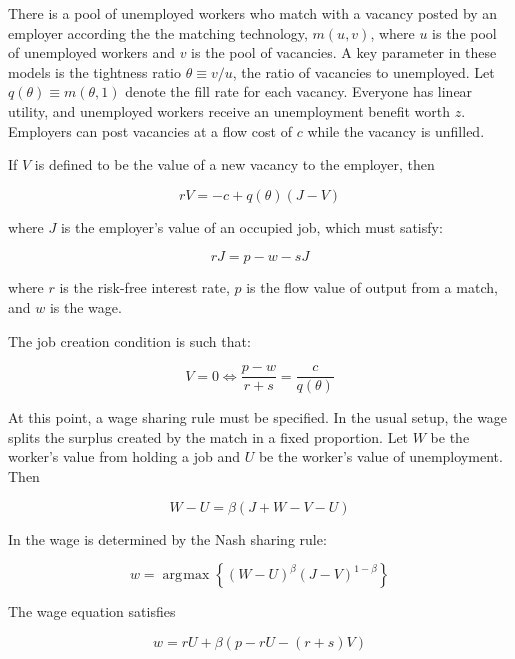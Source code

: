 \documentclass[11pt]{article}
\DeclareMathOperator*{\argmax}{arg\!\max}
\begin{document}
There is a pool of unemployed workers who match with a vacancy posted by an employer according the the matching technology, $m(u, v)$,
where $u$ is the pool of unemployed workers and $v$ is the pool of vacancies.
A key parameter in these models is the tightness ratio $\theta \equiv v/u$, the ratio of vacancies to unemployed.
Let $q(\theta) \equiv m(\theta, 1)$ denote the fill rate for each vacancy.
Everyone has linear utility, and unemployed workers receive an unemployment benefit worth $z$.
Employers can post vacancies at a flow cost of $c$ while the vacancy is unfilled.

If $V$ is defined to be the value of a new vacancy to the employer, then

\begin{equation}
    rV = -c + q(\theta)(J - V)
\end{equation}

where $J$ is the employer's value of an occupied job, which must satisfy:

\begin{equation}
    rJ = p - w - sJ
\end{equation}

where $r$ is the risk-free interest rate, $p$ is the flow value of output from a match, and $w$ is the wage.

The job creation condition is such that:

\begin{equation}
    V = 0 \iff \frac{p - w}{r + s} = \frac{c}{q(\theta)}
\end{equation}

At this point, a wage sharing rule must be specified.
In the usual setup, the wage splits the surplus created by the match in a fixed proportion.
Let $W$ be the worker's value from holding a job and $U$ be the worker's value of unemployment.
Then

\begin{equation}
    W - U = \beta (J + W - V - U)
\end{equation}

In \cite{pissarides_2009} the wage is determined by the Nash sharing rule:

\begin{equation}
    w = \argmax \left\{ (W - U)^\beta (J - V)^{1 - \beta} \right\}
\end{equation}

The wage equation satisfies

\begin{equation} \label{eq:wage_general}
    w = r U + \beta (p - r U - (r + s) V)
\end{equation}
\end{document}
